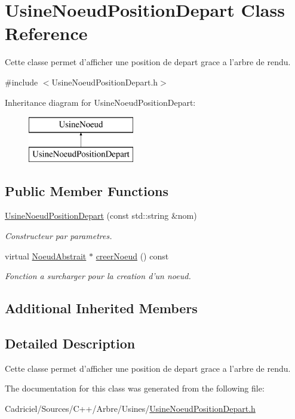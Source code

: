 \hypertarget{class_usine_noeud_position_depart}{\section{Usine\-Noeud\-Position\-Depart Class Reference}
\label{class_usine_noeud_position_depart}
}


Cette classe permet d'afficher une position de depart grace a l'arbre de rendu.  




{\ttfamily \#include $<$Usine\-Noeud\-Position\-Depart.\-h$>$}

Inheritance diagram for Usine\-Noeud\-Position\-Depart\-:\begin{figure}[H]
\begin{center}
\leavevmode
\includegraphics[height=2.000000cm]{class_usine_noeud_position_depart}
\end{center}
\end{figure}
\subsection*{Public Member Functions}
\begin{DoxyCompactItemize}
\item 
\hyperlink{group__inf2990_gaa7bf2ec758b59b54e0776c30755478b8}{Usine\-Noeud\-Position\-Depart} (const std\-::string \&nom)
\begin{DoxyCompactList}\small\item\em Constructeur par parametres. \end{DoxyCompactList}\item 
virtual \hyperlink{class_noeud_abstrait}{Noeud\-Abstrait} $\ast$ \hyperlink{group__inf2990_ga7406e1b6360fc291108fe2f4e6f9182c}{creer\-Noeud} () const 
\begin{DoxyCompactList}\small\item\em Fonction a surcharger pour la creation d'un noeud. \end{DoxyCompactList}\end{DoxyCompactItemize}
\subsection*{Additional Inherited Members}


\subsection{Detailed Description}
Cette classe permet d'afficher une position de depart grace a l'arbre de rendu. 

The documentation for this class was generated from the following file\-:\begin{DoxyCompactItemize}
\item 
Cadriciel/\-Sources/\-C++/\-Arbre/\-Usines/\hyperlink{_usine_noeud_position_depart_8h}{Usine\-Noeud\-Position\-Depart.\-h}\end{DoxyCompactItemize}
